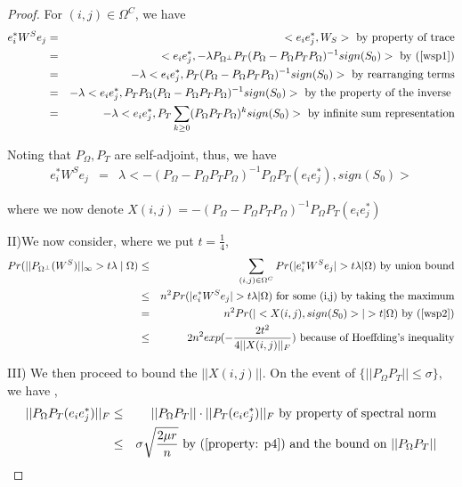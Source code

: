 \begin{proof}
For $(i,j)\in\Omega^{C}$, we have
\begin{eqnarray*}
e_{i}^{*}W^{S}e_{j} & = & <e_{i}e_{j}^{*},W_{S}> \text{ by property of trace}\\
 & = & <e_{i}e_{j}^{*},-\lambda P_{\Omega^{\bot}}P_{T}(P_{\Omega}-P_{\Omega}P_{T}P_{\Omega})^{-1}sign(S_{0})> \text{ by (\ref{wsp1})}\\
 & = & -\lambda<e_{i}e_{j}^{*},P_{T}(P_{\Omega}-P_{\Omega}P_{T}P_{\Omega})^{-1}sign(S_{0})> \text{ by rearranging terms}\\
 & = & -\lambda<e_{i}e_{j}^{*},P_{T}P_{\Omega}(P_{\Omega}-P_{\Omega}P_{T}P_{\Omega})^{-1}sign(S_{0})> \text{ by the property of the inverse }\\
 & = & -\lambda<e_{i}e_{j}^{*},P_{T}\sum_{k\ge0}(P_{\Omega}P_{T}P_{\Omega})^{k}sign(S_{0})> \text{ by infinite sum representation}
\end{eqnarray*}


Noting that $P_{\Omega},P_{T}$ are self-adjoint, thus, we have
\begin{eqnarray}
e_{i}^{*}W^{S}e_{j} & = & \lambda<-(P_{\Omega}-P_{\Omega}P_{T}P_{\Omega})^{-1}P_{\Omega}P_{T}(e_{i}e_{j}^{*}),sign(S_{0})>
\label{wsp2}
\end{eqnarray}


where we now denote $X(i,j)=-(P_{\Omega}-P_{\Omega}P_{T}P_{\Omega})^{-1}P_{\Omega}P_{T}(e_{i}e_{j}^{*})$

II)We now consider, where we put $t=\frac{1}{4}$,
\begin{eqnarray*}
Pr(||P_{\Omega^{\bot}}(W^{S})||_{\infty}>t\lambda\mid\Omega) & \le & \sum_{(i,j)\in\Omega^{C}}Pr(|e_{i}^{*}W^{S}e_{j}|>t\lambda|\Omega) \text{ by union bound}\\
 & \le & n^{2}Pr(|e_{i}^{*}W^{S}e_{j}|>t\lambda|\Omega)\text{ for some (i,j)} \text{ by taking the maximum}\\
 & = & n^{2}Pr(|<X(i,j),sign(S_{0})>|>t|\Omega) \text{ by (\ref{wsp2})}\\
 & \le & 2n^{2}exp(-\frac{2t^{2}}{4||X(i,j)||_{F}})\text{ because of Hoeffding's inequality}
\end{eqnarray*}


III) We then proceed to bound the $||X(i,j)||$. On the event of $\{||P_{\Omega}P_{T}||\le\sigma\}$,
we have ,
\begin{eqnarray*}
||P_{\Omega}P_{T}(e_{i}e_{j}^{*})||_{F} & \le & ||P_{\Omega}P_{T}||\cdot||P_{T}(e_{i}e_{j}^{*})||_{F} \text{ by property of spectral norm}\\
 & \le & \sigma\sqrt{\frac{2\mu r}{n}} \text{ by (\ref{property: p4}) and the bound on } ||P_{\Omega}P_{T}||
\end{eqnarray*}



\end{proof}
